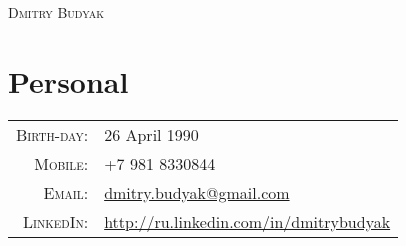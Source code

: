 \documentclass[a4paper,10pt]{article}
\begin{document}
\pagestyle{empty}
\par{\centering
	\Huge \textsc{Dmitry Budyak}
	}\bigskip\par

\section{Personal}
	\begin{tabular}{rl}
	\textsc{Birth-day:} &  26 April 1990 \\
	\textsc{Mobile:}     & +7 981 8330844 \\
	\textsc{Email:}     & \href{mailto:dmitry.budyak@gmail.com}{dmitry.budyak@gmail.com} \\
	\textsc{LinkedIn:} & \href{http://ru.linkedin.com/in/dmitrybudyak}{http://ru.linkedin.com/in/dmitrybudyak}
	\end{tabular}
\end{document}
